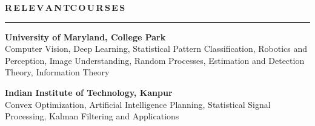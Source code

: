 \documentclass[11pt, a4paper]{article}
\begin{document}

%
%
%
%
%
%
%
%
%
%

\vspace{10pt}
\textbf{R\,E\,L\,E\,V\,A\,N\,T{\hspace{0.6em}}C\,O\,U\,R\,S\,E\,S}
\vspace{5pt}
\hrule
\vspace{7pt}
\textbf{University of Maryland, College Park}\\
Computer Vision, Deep Learning, Statistical Pattern Classification, Robotics and Perception, Image Understanding, Random Processes, Estimation and Detection Theory, Information Theory

\vspace{5pt}

\textbf{Indian Institute of Technology, Kanpur}\\
Convex Optimization, Artificial Intelligence Planning, Statistical Signal Processing, Kalman Filtering and Applications
\end{document}
